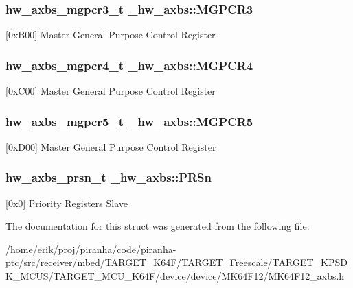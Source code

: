 \subsubsection[{\texorpdfstring{M\+G\+P\+C\+R3}{MGPCR3}}]{ {\bf hw\+\_\+axbs\+\_\+mgpcr3\+\_\+t} \+\_\+hw\+\_\+axbs\+::\+M\+G\+P\+C\+R3}\hypertarget{struct__hw__axbs_af812926b79e3f6bdd48fdca5d893cf66}{}\label{struct__hw__axbs_af812926b79e3f6bdd48fdca5d893cf66}
\mbox{[}0x\+B00\mbox{]} Master General Purpose Control Register 
\subsubsection[{\texorpdfstring{M\+G\+P\+C\+R4}{MGPCR4}}]{ {\bf hw\+\_\+axbs\+\_\+mgpcr4\+\_\+t} \+\_\+hw\+\_\+axbs\+::\+M\+G\+P\+C\+R4}\hypertarget{struct__hw__axbs_a03bb66129841af192f7c9175c251308a}{}\label{struct__hw__axbs_a03bb66129841af192f7c9175c251308a}
\mbox{[}0x\+C00\mbox{]} Master General Purpose Control Register 
\subsubsection[{\texorpdfstring{M\+G\+P\+C\+R5}{MGPCR5}}]{ {\bf hw\+\_\+axbs\+\_\+mgpcr5\+\_\+t} \+\_\+hw\+\_\+axbs\+::\+M\+G\+P\+C\+R5}\hypertarget{struct__hw__axbs_a99d5ad7431d63b894a611da9f9b6876f}{}\label{struct__hw__axbs_a99d5ad7431d63b894a611da9f9b6876f}
\mbox{[}0x\+D00\mbox{]} Master General Purpose Control Register 
\subsubsection[{\texorpdfstring{P\+R\+Sn}{PRSn}}]{ {\bf hw\+\_\+axbs\+\_\+prsn\+\_\+t} \+\_\+hw\+\_\+axbs\+::\+P\+R\+Sn}\hypertarget{struct__hw__axbs_a39b8662f17de0eb609cb38e43fbb8954}{}\label{struct__hw__axbs_a39b8662f17de0eb609cb38e43fbb8954}
\mbox{[}0x0\mbox{]} Priority Registers Slave 

The documentation for this struct was generated from the following file\+:\begin{DoxyCompactItemize}
\item 
/home/erik/proj/piranha/code/piranha-\/ptc/src/receiver/mbed/\+T\+A\+R\+G\+E\+T\+\_\+\+K64\+F/\+T\+A\+R\+G\+E\+T\+\_\+\+Freescale/\+T\+A\+R\+G\+E\+T\+\_\+\+K\+P\+S\+D\+K\+\_\+\+M\+C\+U\+S/\+T\+A\+R\+G\+E\+T\+\_\+\+M\+C\+U\+\_\+\+K64\+F/device/device/\+M\+K64\+F12/M\+K64\+F12\+\_\+axbs.\+h\end{DoxyCompactItemize}
